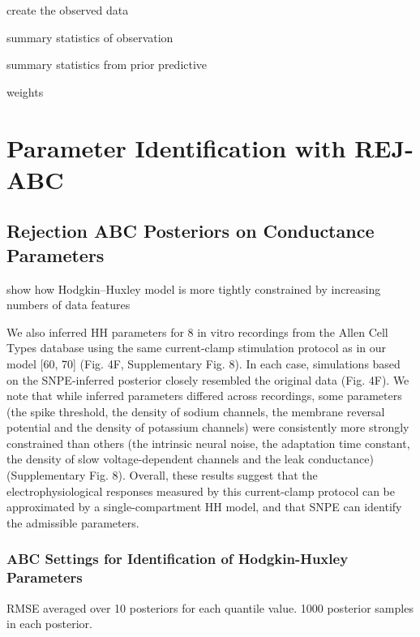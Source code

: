 create the observed data

summary statistics of observation 

summary statistics from prior predictive

weights


\chapter{Parameter Identification with REJ-ABC}

\section{Rejection ABC Posteriors on Conductance Parameters}

show how Hodgkin–Huxley model is more tightly constrained by increasing numbers of data features

We also inferred HH parameters for 8 in vitro recordings from the Allen Cell Types database using the same current-clamp stimulation protocol as in our model [60, 70] (Fig. 4F, Supplementary Fig. 8). In each case, simulations based on the SNPE-inferred posterior closely resembled the original data (Fig. 4F). We note that while inferred parameters differed across recordings, some parameters (the spike threshold, the density of sodium channels, the membrane reversal potential and the density of potassium channels) were consistently more strongly constrained than others (the intrinsic neural noise, the adaptation time constant, the density of slow voltage-dependent channels and the leak conductance) (Supplementary Fig. 8). Overall, these results suggest that the electrophysiological responses measured by this current-clamp protocol can be approximated by a single-compartment HH model, and that SNPE can identify the admissible parameters.

\subsection{ABC Settings for Identification of Hodgkin-Huxley Parameters}

RMSE averaged over 10 posteriors for each quantile value. 1000 posterior samples in each posterior. 

